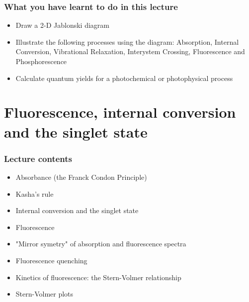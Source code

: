 \documentclass[a4paper,12pt,titlepage]{article}
\begin{document}
\begin{frame}
\frametitle{What you have learnt to do in this lecture}
\begin{itemize}
\item Draw a 2-D Jablonski diagram
\item Illustrate the following processes using the diagram: Absorption, Internal Conversion, Vibrational Relaxation, Interystem Crossing, Fluorescence and Phosphorescence
\item Calculate quantum yields for a photochemical or photophysical process
\end{itemize}
\end{frame}


\section{Fluorescence, internal conversion and the singlet state}
	\begin{frame}
	\frametitle{Lecture contents}
		\begin{itemize}
			\item Absorbance (the Franck Condon Principle)
			\item Kasha's rule
			\item Internal conversion and the singlet state
			\item Fluorescence 
			\item "Mirror symetry" of absorption and fluorescence spectra
			\item Fluorescence quenching
			\item Kinetics of fluorescence: the Stern-Volmer relationship
			\item Stern-Volmer plots
		\end{itemize}
	\end{frame}
\end{document}
